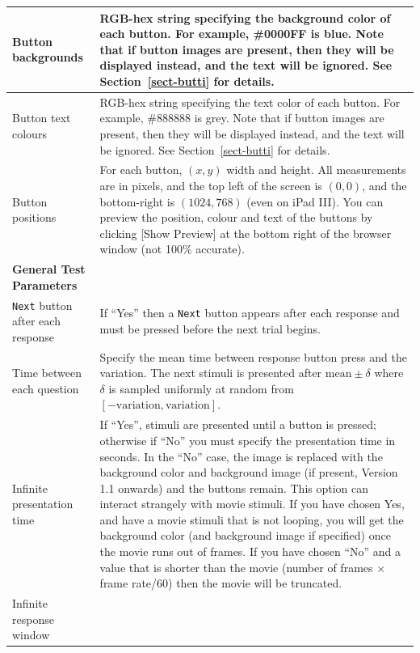 \documentclass{article}
\begin{document}
\begin{longtable}{|p{5cm}|p{10cm}|}
\hline
Button backgrounds & RGB-hex string specifying the background color of each button. For example,
\#0000FF is blue.
Note that if button images are
present, then they will be displayed instead, and the text will be ignored. See
Section~\ref{sect-butti} for details.\\
\hline
Button text colours & RGB-hex string specifying the text color of each button. For example,
\#888888 is grey.
Note that if button images are
present, then they will be displayed instead, and the text will be ignored. See
Section~\ref{sect-butti} for details.\\
\hline
Button positions & For each button, $(x,y)$ width and height.
All measurements are in pixels, and the top left of the screen is $(0,0)$,
and the bottom-right is $(1024,768)$ (even on iPad III). You can preview the position, colour and text of the buttons by clicking [Show Preview] at the bottom right of the browser window (not 100\% accurate).\\
\hline
\hline
{\bf General Test Parameters} & \\\nopagebreak
{\tt Next} button after each response & If ``Yes'' then a {\tt Next} 
            button appears after each response
            and must be pressed before the next trial begins.\\
\hline
Time between each question & Specify the mean time between response button press and the variation.
The next stimuli is presented after $\mbox{mean}\pm\delta$ where $\delta$ is sampled uniformly at
random from $[-\mbox{variation},\mbox{variation}]$. \\
\hline
Infinite presentation time & If ``Yes'', stimuli are presented until a button is pressed; 
otherwise if ``No'' you must specify the presentation 
time in seconds. In the ``No'' case, the image is replaced with the background color
and background image (if present, Version 1.1 onwards) and the buttons remain. 
This option can interact strangely with movie stimuli. 
If you have chosen Yes, and have a movie stimuli that is not looping, you will get the background
color (and background image if specified) 
once the movie runs out of frames. If you have chosen ``No'' and a value that is shorter than 
the movie (number of frames $\times$ frame rate/60) then the movie will be truncated.\\
\hline
Infinite response window


\end{longtable}
\end{document}
